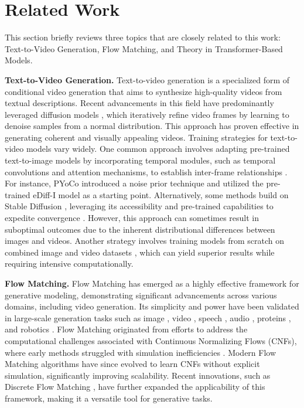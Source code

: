 \section{Related Work}

This section briefly reviews three topics that are closely related to this work: Text-to-Video Generation, Flow Matching, and Theory in Transformer-Based Models. 

{\bf Text-to-Video Generation.}
Text-to-video generation \cite{sph+22, vjp22, brl+23} is a specialized form of conditional video generation that aims to synthesize high-quality videos from textual descriptions. Recent advancements in this field have predominantly leveraged diffusion models \cite{ssk+20,hja20}, which iteratively refine video frames by learning to denoise samples from a normal distribution. This approach has proven effective in generating coherent and visually appealing videos.
Training strategies for text-to-video models vary widely. One common approach involves adapting pre-trained text-to-image models by incorporating temporal modules, such as temporal convolutions and attention mechanisms, to establish inter-frame relationships \cite{gnl+23, azy+23, sph+22, gwz+23, gyr+23}. For instance, PYoCo \cite{gnl+23} introduced a noise prior technique and utilized the pre-trained eDiff-I model \cite{bnh+22} as a starting point. Alternatively, some methods build on Stable Diffusion \cite{rbl+22}, leveraging its accessibility and pre-trained capabilities to expedite convergence \cite{brl+23,zwy+22}. However, this approach can sometimes result in suboptimal outcomes due to the inherent distributional differences between images and videos. Another strategy involves training models from scratch on combined image and video datasets \cite{hcs+22}, which can yield superior results while requiring intensive computationally.
\ifdefined\isarxiv
\else
\vspace{-2mm}
\fi

{\bf Flow Matching.}
Flow Matching has emerged as a highly effective framework for generative modeling, demonstrating significant advancements across various domains, including video generation. Its simplicity and power have been validated in large-scale generation tasks such as image \cite{ekb+24}, video \cite{pzb+24,jsl+24}, speech \cite{lvs+24},  audio \cite{vsl+23}, proteins \cite{hvf+24}, and robotics \cite{bbd+24}. Flow Matching originated from efforts to address the computational challenges associated with Continuous Normalizing Flows (CNFs), where early methods struggled with simulation inefficiencies \cite{rgnl21,bcba+22}. Modern Flow Matching algorithms \cite{lcb+22,lgl22,av22,nbsm23,hbc23,tfm+23} have since evolved to learn CNFs without explicit simulation, significantly improving scalability. Recent innovations, such as Discrete Flow Matching \cite{cyb+24,grs+24}, have further expanded the applicability of this framework, making it a versatile tool for generative tasks.

